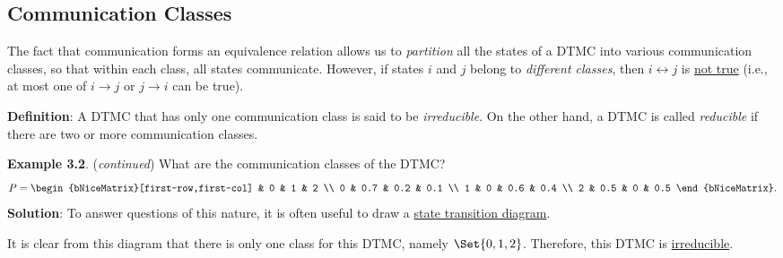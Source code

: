 \subsection*{Communication Classes}
The fact that communication forms an equivalence relation allows us to \emph{partition} all the states
of a DTMC into various communication classes, so that within each class, all states
communicate. However, if states $i$ and $j$ belong to \emph{different classes}, then $ i\leftrightarrow j $ is \underline{not true}
(i.e., at most one of $ i\rightarrow j $ or $ j\rightarrow i $ can be true).
\begin{Regular}
    \textbf{Definition}: A DTMC that has only one communication class is said to be \emph{irreducible}. On the
    other hand, a DTMC is called \emph{reducible} if there are two or more communication classes.
\end{Regular}
\begin{Example}
    \textbf{Example 3.2}. (\emph{continued}) What are the communication classes of the DTMC\@?
    \[ P=\begin{bNiceMatrix}[first-row,first-col]
              & 0   & 1   & 2   \\
            0 & 0.7 & 0.2 & 0.1 \\
            1 & 0   & 0.6 & 0.4 \\
            2 & 0.5 & 0   & 0.5
        \end{bNiceMatrix}. \]
    \tcblower{}
    \textbf{Solution}: To answer questions of this nature, it is often useful to
    draw a \underline{state transition diagram}.
    \begin{center}
    \end{center}
    It is clear from this diagram that there is only one class for this DTMC,
    namely $ \Set{0,1,2} $. Therefore, this DTMC is
    \underline{irreducible}.
\end{Example}
